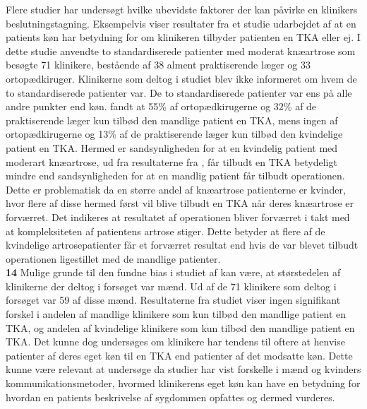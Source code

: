 Flere studier har undersøgt hvilke ubevidste faktorer der kan påvirke en klinikers beslutningstagning. Eksempelvis viser resultater fra et studie udarbejdet af \cite{borkhoff2008} at en patients køn har betydning for om klinikeren tilbyder patienten en TKA eller ej. I dette studie anvendte \cite{borkhoff2008} to standardiserede patienter med moderat knæartrose som besøgte 71 klinikere, bestående af 38 alment praktiserende læger og 33 ortopædkiruger. Klinikerne som deltog i studiet blev ikke informeret om hvem de to standardiserede patienter var. De to standardiserede patienter var ens på alle andre punkter end køn. \cite{borkhoff2008} fandt at 55\% af ortopædkirugerne og 32\% af de praktiserende læger kun tilbød den mandlige patient en TKA, mens ingen af ortopædkirugerne og 13\% af de praktiserende læger kun tilbød den kvindelige patient en TKA. Hermed er sandsynligheden for at en kvindelig patient med moderart knæartrose, ud fra resultaterne fra \cite{borkhoff2008}, får tilbudt en TKA betydeligt mindre end sandsynligheden for at en mandlig patient får tilbudt operationen. Dette er problematisk da en større andel af knæartrose patienterne er kvinder, hvor flere af disse hermed først vil blive tilbudt en TKA når deres knæartrose er forværret. Det indikeres at resultatet af operationen bliver forværret i takt med at kompleksiteten af patientens artrose stiger. \citep{fortin1999} Dette betyder at flere af de kvindelige artrosepatienter får et forværret resultat end hvis de var blevet tilbudt operationen ligestillet med de mandlige patienter. \citep{borkhoff2008} \\
\textbf{14} Mulige grunde til den fundne bias i studiet af \cite{borkhoff2008} kan være, at størstedelen af klinikerne der deltog i forsøget var mænd. Ud af de 71 klinikere som deltog i forsøget var 59 af disse mænd. Resultaterne fra studiet viser ingen signifikant forskel i andelen af mandlige klinikere som kun tilbød den mandlige patient en TKA, og andelen af kvindelige klinikere som kun tilbød den mandlige patient en TKA. Det kunne dog undersøges om klinikere har tendens til oftere at henvise patienter af deres eget køn til en TKA end patienter af det modsatte køn. Dette kunne være relevant at undersøge da studier har vist forskelle i mænd og kvinders kommunikationsmetoder, hvormed klinikerens eget køn kan have en betydning for hvordan en patients beskrivelse af sygdommen opfattes og dermed vurderes. \citep{street2002}   

